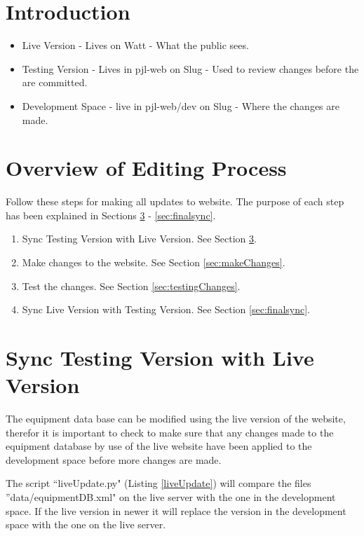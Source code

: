 \documentclass[justified]{pjlProcessDocs}
\begin{document}
\section{Introduction}

\begin{itemize}
\item Live Version - Lives on Watt - What the public sees.
\item Testing Version - Lives in pjl-web on Slug - Used to review changes before the are committed.
\item Development Space - live in pjl-web/dev on Slug - Where the changes are made.
\end{itemize}


\section{Overview of Editing Process}

Follow these steps for making all updates to website. The purpose of each step has been explained in Sections \ref{sec:initsync} - \ref{sec:finalsync}.

\begin{enumerate}
\item Sync Testing Version with Live Version. See Section \ref{sec:initsync}.
\item Make changes to the website. See Section \ref{sec:makeChanges}.
\item Test the changes. See Section  \ref{sec:testingChanges}.
\item Sync Live Version with Testing Version. See Section \ref{sec:finalsync}.
\end{enumerate}

\section{Sync Testing Version with Live Version}\label{sec:initsync}

The equipment data base can be modified using the live version of the website, therefor it is important to check to make sure that any changes made to the equipment database by use of the live website have been applied to the development space before more changes are made. 

The script ``liveUpdate.py" (Listing \ref{liveUpdate}) will compare the files ''data/equipmentDB.xml" on the live server with the one in the development space. If the live version in newer it will replace the version in the development space with the one on the live server.
\end{document}
